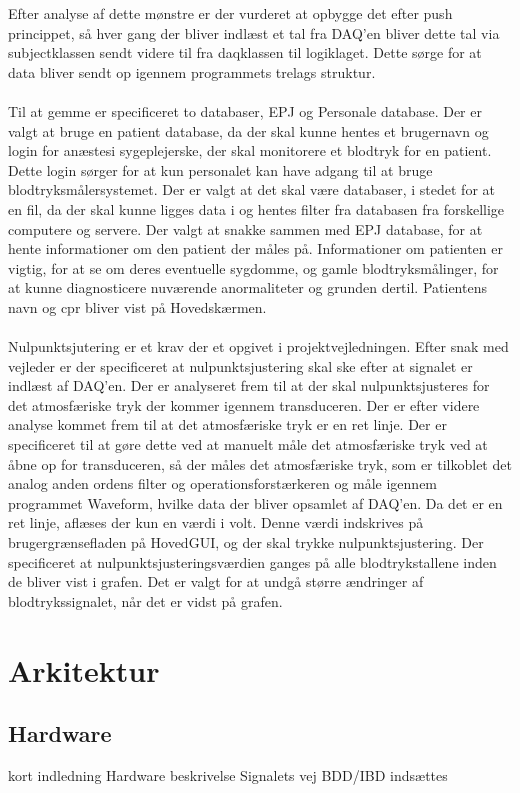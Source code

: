 Efter analyse af dette mønstre er der vurderet at opbygge det efter push princippet, så hver gang der bliver indlæst et tal fra DAQ’en bliver dette tal via subjectklassen sendt videre til fra daqklassen til logiklaget. Dette sørge for at data bliver sendt op igennem programmets trelags struktur. \\\\
Til at gemme er specificeret to databaser, EPJ og Personale database. Der er valgt at bruge en patient database, da der skal kunne hentes et brugernavn og login for anæstesi sygeplejerske, der skal monitorere et blodtryk for en patient. Dette login sørger for at kun personalet kan have adgang til at bruge blodtryksmålersystemet.  Der er valgt at det skal være databaser, i stedet for at en fil, da der skal kunne ligges data i og hentes filter fra databasen fra forskellige computere og servere. Der valgt at snakke sammen med EPJ database, for at hente informationer om den patient der måles på. Informationer om patienten er vigtig, for at se om deres eventuelle sygdomme, og gamle blodtryksmålinger, for at kunne diagnosticere nuværende anormaliteter og grunden dertil. Patientens navn og cpr bliver vist på Hovedskærmen. \\\\
Nulpunktsjutering er et krav der et opgivet i projektvejledningen. Efter snak med vejleder er der specificeret at nulpunktsjustering skal ske efter at signalet er indlæst af DAQ’en. Der er analyseret frem til at der skal nulpunktsjusteres for det atmosfæriske tryk der kommer igennem transduceren. Der er efter videre analyse kommet frem til at det atmosfæriske tryk er en ret linje. Der er specificeret til at gøre dette ved at manuelt måle det atmosfæriske tryk ved at åbne op for transduceren, så der måles det atmosfæriske tryk, som er tilkoblet det analog anden ordens filter og operationsforstærkeren og måle igennem programmet Waveform, hvilke data der bliver opsamlet af DAQ’en. Da det er en ret linje, aflæses der kun en værdi i volt. Denne værdi indskrives på brugergrænsefladen på HovedGUI, og der skal trykke nulpunktsjustering. Der specificeret at nulpunktsjusteringsværdien ganges på alle blodtrykstallene inden de bliver vist i grafen. Det er valgt for at undgå større ændringer af blodtrykssignalet, når det er vidst på grafen. 

	\section{Arkitektur}
	\subsection{Hardware}
	kort indledning
	Hardware beskrivelse
	Signalets vej
	BDD/IBD indsættes
